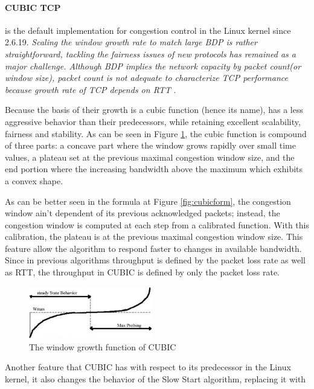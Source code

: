 \paragraph{CUBIC TCP}  is the default implementation for congestion control in
the Linux kernel since 2.6.19. \textit{Scaling the window growth rate to match
large \gls{BDP} is rather straightforward, tackling the fairness issues of new
protocols has remained as a major challenge.  Although BDP implies the network
capacity by packet count(or window size), packet count is not adequate to
characterize TCP performance because growth rate of TCP depends on
RTT} \cite{HaCubic}.

Because the basis of their growth is a cubic function (hence its name), has a
less aggressive behavior than their predecessors, while retaining excellent
scalability, fairness and stability. As can be seen in Figure
\ref{fig:cubicfunc}, the cubic function is compound of three parts: a concave
part where the window grows rapidly over small time values, a plateau set at the previous maximal
congestion window size, and the end portion where the increasing bandwidth
above the maximum which exhibits a convex shape.

As can be better seen in the formula at Figure \ref{fig:cubicform}, the congestion
window ain't dependent of its previous acknowledged packets; instead, the
congestion window is computed at each step from a calibrated function. With
this calibration, the plateau is at the previous maximal congestion window
size. This feature allow the algorithm to respond faster to changes in
available bandwidth. Since in previous algorithms throughput is defined by the
packet loss rate as well as RTT, the throughput in CUBIC is defined by only
the packet loss rate.

\begin{figure}
\begin{center}
    \includegraphics[width=0.48\textwidth]{img/cubic}
  \end{center}
\caption{The window growth function of CUBIC}
\label{fig:cubicfunc}
\end{figure}

Another feature that CUBIC has with respect to its predecessor in the Linux
kernel, it also changes the behavior of the Slow Start algorithm, replacing it
with


